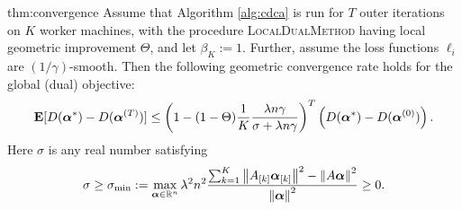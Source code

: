 \documentclass{article} %
\newcommand{\localalgname}{\textsc{LocalDualMethod}\xspace}
\begin{document}
\begin{reptheorem}{thm:convergence}
Assume that Algorithm \ref{alg:cdca} is run for $T$ outer iterations on $K$ worker machines, 
with the procedure \localalgname having local geometric improvement $\Theta$, and let $\beta_K:=1$.
Further, assume the loss functions $\ell_i$ are $(1/\gamma)$-smooth.
Then the following geometric convergence rate holds for the global (dual) objective:
\begin{equation*}%
\E[D(\av^*) - D(\av^{(T)})]
\leq 
\left(1-(1-\Theta)
 \frac1K
  \frac{\lambda n \gamma }{\sigma
   + \lambda n \gamma }
\right)^T     \left(D(\av^*) - D(\av^{(0)})\right).
\end{equation*}
Here $\sigma$ is any real number satisfying
\begin{align*}%
 \sigma
\geq%
\sigma_{\min} := \max_{\av \in \R^n}
\lambda^2 n^2 %
\frac{ \textstyle{\sum}_{k=1}^K   
  \norm{ A_{[k]}   \av_{[k]} }^2  -
  \norm{ A \av }^2 
   }
   {\norm{ \av }^2   } \geq 0.
\end{align*}
\end{reptheorem}
%
\end{document}
